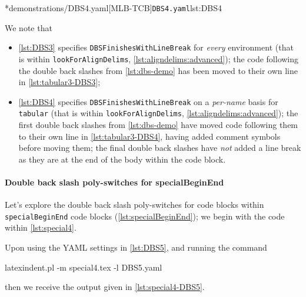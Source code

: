 		\begin{cmhtcbraster}[raster column skip=.01\linewidth]
			\cmhlistingsfromfile[style=yaml-LST]*{demonstrations/DBS4.yaml}[MLB-TCB]{\texttt{DBS4.yaml}}{lst:DBS4}
		\end{cmhtcbraster}

		We note that
		\begin{itemize}
			\item \cref{lst:DBS3} specifies \texttt{DBSFinishesWithLineBreak} for
			      \emph{every} environment (that is within \texttt{lookForAlignDelims},
			      \vref{lst:aligndelims:advanced});
			      the code following the double back slashes from \cref{lst:dbs-demo} has been moved to
			      their own line in \cref{lst:tabular3-DBS3};
			\item \cref{lst:DBS4} specifies \texttt{DBSFinishesWithLineBreak} on a
			      \emph{per-name} basis for \texttt{tabular} (that is within \texttt{lookForAlignDelims},
			      \vref{lst:aligndelims:advanced});
			      the first double back slashes from \cref{lst:dbs-demo} have moved code following them to
			      their own line in \cref{lst:tabular3-DBS4}, having added comment symbols before moving
			      them; the final double back slashes have \emph{not} added a line break as they are at the
			      end of the body within the code block.
		\end{itemize}

	\paragraph{Double back slash poly-switches for specialBeginEnd}
		Let's explore the double back slash poly-switches for code blocks within
		\texttt{specialBeginEnd} code blocks (\vref{lst:specialBeginEnd}); we begin with the code
		within \cref{lst:special4}.


		Upon using the YAML settings in \cref{lst:DBS5}, and running the command
		\begin{commandshell}
latexindent.pl -m special4.tex -l DBS5.yaml
\end{commandshell}
		then we receive the output given in \cref{lst:special4-DBS5}.

